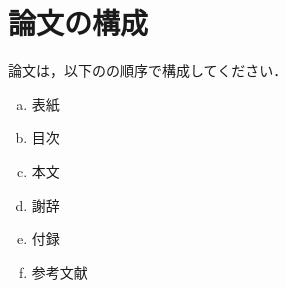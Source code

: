 \chapter{論文の構成}\label{chap:論文の構成}
論文は，以下のの順序で構成してください．

	\begin{enumerate}[a.]
		\item 表紙 \label{term:a}
		\item 目次 \label{term:b}
		\item 本文 \label{term:c}
		\item 謝辞 \label{term:d}
		\item 付録 \label{term:e}
		\item 参考文献 \label{term:f}
	\end{enumerate}